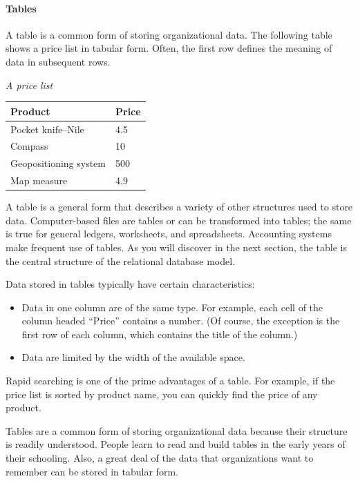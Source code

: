 \documentclass[
]{article}
\begin{document}
\hypertarget{tables}{%
\paragraph*{Tables}\label{tables}}

A table is a common form of storing organizational data. The following
table shows a price list in tabular form. Often, the first row defines
the meaning of data in subsequent rows.

\emph{A price list}

\begin{longtable}[]{@{}ll@{}}
\toprule
Product & Price \\
\midrule
\endhead
Pocket knife--Nile & 4.5 \\
Compass & 10 \\
Geopositioning system & 500 \\
Map measure & 4.9 \\
\bottomrule
\end{longtable}

A table is a general form that describes a variety of other structures
used to store data. Computer-based files are tables or can be
transformed into tables; the same is true for general ledgers,
worksheets, and spreadsheets. Accounting systems make frequent use of
tables. As you will discover in the next section, the table is the
central structure of the relational database model.

Data stored in tables typically have certain characteristics:

\begin{itemize}
\item
  Data in one column are of the same type. For example, each cell of
  the column headed ``Price'' contains a number. (Of course, the
  exception is the first row of each column, which contains the title
  of the column.)
\item
  Data are limited by the width of the available space.
\end{itemize}

Rapid searching is one of the prime advantages of a table. For example,
if the price list is sorted by product name, you can quickly find the
price of any product.

Tables are a common form of storing organizational data because their
structure is readily understood. People learn to read and build tables
in the early years of their schooling. Also, a great deal of the data
that organizations want to remember can be stored in tabular form.
\end{document}
